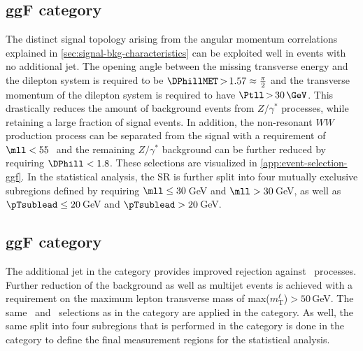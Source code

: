 \subsection{ggF \ZeroJet category}
\label{subsec:ggf-zero-jet-category}
The distinct signal topology arising from the angular momentum correlations explained in \cref{sec:signal-bkg-characteristics} can be exploited well in events with no additional jet.
The opening angle between the missing transverse energy and the dilepton system is required to be $\DPhillMET \,{>}\, 1.57 \approx \frac{\pi}{2}$ and the transverse momentum of the dilepton system is required to have $\Ptll \,{>}\, 30\,\GeV$.
This drastically reduces the amount of background events from $Z/\gamma^*$ processes, while retaining a large fraction of signal events.
In addition, the non-resonant $WW$ production process can be separated from the signal with a requirement of $\mll < 55$\,\GeV\ and the remaining $Z/\gamma^*$ background can be further reduced by requiring $\DPhill < 1.8$. These selections are visualized in \cref{app:event-selection-ggf}.
In the statistical analysis, the \ZeroJet SR is further split into four mutually exclusive subregions defined by requiring $\mll \le 30$\,GeV and $\mll > 30$\,GeV, as well as $\pTsublead \le 20$\,GeV and $\pTsublead > 20$\,GeV.

\subsection{ggF \OneJet category}
\label{subsec:ggf-one-jet-category}
The additional jet in the \OneJet category provides improved rejection against \Ztautau\ processes.
Further reduction of the \Zgamma background as well as multijet events is achieved with a requirement on the maximum lepton transverse mass of max($m_{\text{T}}^\ell$)$ > 50\,$GeV.
The same \mll\ and \DPhill\ selections as in the \ZeroJet category are applied in the \OneJet category.
As well, the same split into four subregions that is performed in the \ZeroJet category is done in the \OneJet category to define the final measurement regions for the statistical analysis. 

